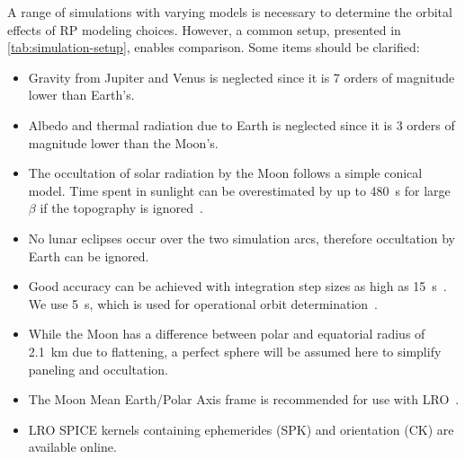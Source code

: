 A range of simulations with varying models is necessary to determine the orbital effects of \gls{RP} modeling choices. However, a common setup, presented in \cref{tab:simulation-setup}, enables comparison. Some items should be clarified:
\begin{itemize}
    \item Gravity from Jupiter and Venus is neglected since it is 7 orders of magnitude lower than Earth's.
    \item Albedo and thermal radiation due to Earth is neglected since it is 3 orders of magnitude lower than the Moon's.
    \item The occultation of solar radiation by the Moon follows a simple conical model. Time spent in sunlight can be overestimated by up to \qty{480}{\s} for large $\beta$ if the topography is ignored~\cite{Mazarico2018}.
    \item No lunar eclipses occur over the two simulation arcs, therefore occultation by Earth can be ignored.
    \item Good accuracy can be achieved with integration step sizes as high as \qty{15}{\s}~\cite{Mazarico2018}. We use \qty{5}{\s}, which is used for operational orbit determination~\cite{Nicholson2010}.
    \item While the Moon has a difference between polar and equatorial radius of \qty{2.1}{\km} due to flattening, a perfect sphere will be assumed here to simplify paneling and occultation.
    \item The Moon Mean Earth/Polar Axis frame is recommended for use with \gls{LRO}~\cite{GSFC2008}.
    \item \gls{LRO} SPICE kernels containing ephemerides (SPK) and orientation (CK) are available online.
\end{itemize}
